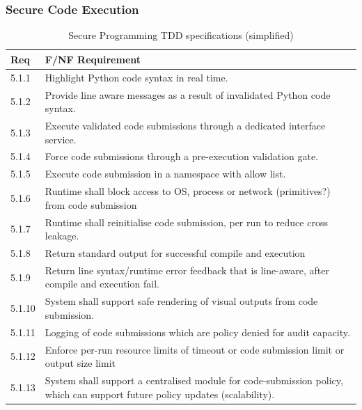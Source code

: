 \documentclass{article}
\begin{document}
\subsubsection{Secure Code Execution}
\begin{table}[H]
\centering
\begin{tabular}{|p{1cm}|p{12cm}|}
\hline
\textbf{Req} & \textbf{F/NF Requirement} \\
\hline
5.1.1 & Highlight Python code syntax in real time. \\
\hline
5.1.2 & Provide line aware messages as a result of invalidated Python code syntax.\\
\hline
5.1.3 & Execute validated code submissions through a dedicated interface service. \\
\hline
5.1.4 & Force code submissions through a pre-execution validation gate. \\
\hline
5.1.5 & Execute code submission in a namespace with allow list. \\
\hline
5.1.6 & Runtime shall block access to OS, process or network (primitives?) from code submission \\
\hline
5.1.7 & Runtime shall reinitialise code submission, per run to reduce cross leakage. \\
\hline
5.1.8 & Return standard output for successful compile and execution \\
\hline
5.1.9 & Return line syntax/runtime error feedback that is line-aware, after compile and execution fail. \\
\hline
5.1.10 & System shall support safe rendering of visual outputs from code submission. \\
\hline
5.1.11 & Logging of code submissions which are policy denied for audit capacity. \\
\hline
5.1.12 & Enforce per-run resource limits of timeout or code submission limit or output size limit \\
\hline
5.1.13 & System shall support a centralised module for code-submission policy, which can support future policy updates (scalability).  \\
\hline
\end{tabular}
\caption{Secure Programming TDD specifications (simplified)}
\end{table}
\end{document}
